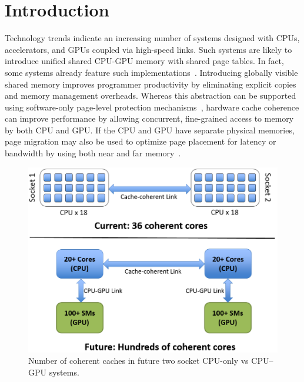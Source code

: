 \section{Introduction}
\label{introduction}

Technology trends indicate an increasing number of systems designed with CPUs, 
accelerators, and GPUs coupled via high-speed 
links. Such systems are likely to introduce unified shared
CPU-GPU memory with shared page tables. In fact, some systems already
feature such implementations~\cite{AMDKaveri}.
Introducing globally visible shared memory
improves programmer productivity by eliminating explicit copies and memory 
management overheads. Whereas this abstraction can be supported using
software-only page-level protection mechanisms~\cite{UVM, HSA}, hardware cache coherence 
can improve performance by allowing concurrent, fine-grained access to memory
by both CPU and GPU.  If the CPU and GPU have separate physical
memories, page migration may also be used to optimize page placement for
latency or bandwidth by using both near and far 
memory~\cite{Dashti2013,Agarwal2015b,Meswani2015,Chou2015}.

\begin{figure}[t]
\centering
\includegraphics[width=0.9\columnwidth]{figures/coherent_cores.png}
\caption{Number of coherent caches in future two socket CPU-only vs CPU--GPU 
systems.}
\vspace{-0.15in}
\label{fig:motivation}
\end{figure}

